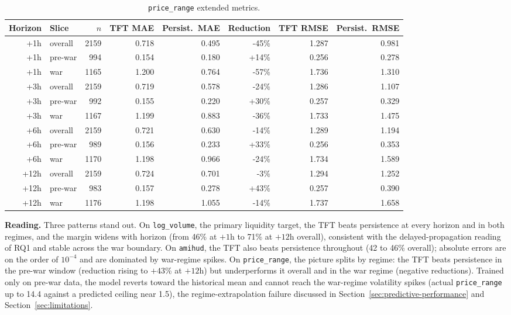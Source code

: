 \begin{table}[h]
  \centering
  \small
  \caption{\texttt{price\_range} extended metrics.}
  \label{tab:metrics-pricerange}
  \begin{tabular}{@{}rlrrrrrr@{}}
    \toprule
    Horizon & Slice & $n$ & TFT MAE & Persist.\ MAE & Reduction & TFT RMSE & Persist.\ RMSE \\
    \midrule
    +1h & overall & 2159 & 0.718 & 0.495 & -45\% & 1.287 & 0.981 \\
    +1h & pre-war & 994 & 0.154 & 0.180 & +14\% & 0.256 & 0.278 \\
    +1h & war & 1165 & 1.200 & 0.764 & -57\% & 1.736 & 1.310 \\
    +3h & overall & 2159 & 0.719 & 0.578 & -24\% & 1.286 & 1.107 \\
    +3h & pre-war & 992 & 0.155 & 0.220 & +30\% & 0.257 & 0.329 \\
    +3h & war & 1167 & 1.199 & 0.883 & -36\% & 1.733 & 1.475 \\
    +6h & overall & 2159 & 0.721 & 0.630 & -14\% & 1.289 & 1.194 \\
    +6h & pre-war & 989 & 0.156 & 0.233 & +33\% & 0.256 & 0.353 \\
    +6h & war & 1170 & 1.198 & 0.966 & -24\% & 1.734 & 1.589 \\
    +12h & overall & 2159 & 0.724 & 0.701 & -3\% & 1.294 & 1.252 \\
    +12h & pre-war & 983 & 0.157 & 0.278 & +43\% & 0.257 & 0.390 \\
    +12h & war & 1176 & 1.198 & 1.055 & -14\% & 1.737 & 1.658 \\
    \bottomrule
  \end{tabular}
\end{table}

\textbf{Reading.} Three patterns stand out. On \texttt{log\_volume}, the primary liquidity target, the TFT beats persistence at every horizon and in both regimes, and the margin widens with horizon (from 46\% at $+1$h to 71\% at $+12$h overall), consistent with the delayed-propagation reading of RQ1 and stable across the war boundary. On \texttt{amihud}, the TFT also beats persistence throughout (42 to 46\% overall); absolute errors are on the order of $10^{-4}$ and are dominated by war-regime spikes. On \texttt{price\_range}, the picture splits by regime: the TFT beats persistence in the pre-war window (reduction rising to $+43$\% at $+12$h) but underperforms it overall and in the war regime (negative reductions). Trained only on pre-war data, the model reverts toward the historical mean and cannot reach the war-regime volatility spikes (actual \texttt{price\_range} up to 14.4 against a predicted ceiling near 1.5), the regime-extrapolation failure discussed in Section~\ref{sec:predictive-performance} and Section~\ref{sec:limitations}.

